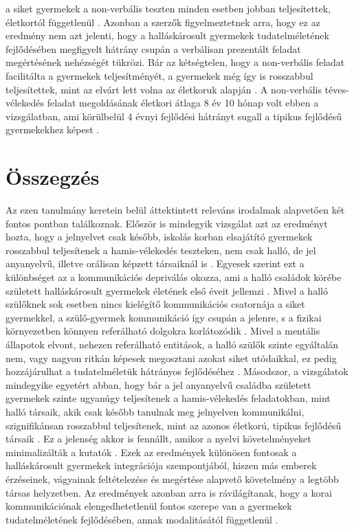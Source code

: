 a siket gyermekek a non-verbális teszten minden esetben jobban teljesítettek, életkortól
függetlenül \autocite{figueras-costa_harris_2001}. Azonban a szerzők figyelmeztetnek arra, hogy ez az eredmény nem azt
jelenti, hogy a halláskárosult gyermekek tudatelméletének fejlődésében megfigyelt hátrány
csupán a verbálisan prezentált feladat megértésének nehézségét tükrözi. Bár az kétségtelen,
hogy a non-verbális feladat facilitálta a gyermekek teljesítményét, a gyermekek még így is
rosszabbul teljesítettek, mint az elvárt lett volna az életkoruk alapján \autocite{figueras-costa_harris_2001}. A non-verbális
téves-vélekedés feladat megoldásának életkori átlaga 8 év 10 hónap volt ebben a vizsgálatban,
ami körülbelül 4 évnyi fejlődési hátrányt sugall a tipikus fejlődésű gyermekekhez képest
\autocite{figueras-costa_harris_2001}.

\pagebreak

\section{Összegzés}

Az ezen tanulmány keretein belül áttektintett releváns irodalmak alapvetően két fontos
pontban találkoznak. Először is mindegyik vizsgálat azt az eredményt hozta, hogy a jelnyelvet
csak később, iskolás korban elsajátító gyermekek rosszabbul teljesítenek a hamis-vélekedés
teszteken, nem csak halló, de jel anyanyelvű, illetve orálisan képzett társaiknál is \autocite{peterson_slaughter_2006,woolfe_want_siegal_2002,peterson_siegal_1999}.
Egyesek szerint ezt a különbséget az a kommunikációs depriválás okozza, ami a halló
családok körébe született halláskárosult gyermekek életének első éveit jellemzi \autocite{perner_leekam_wimmer_1987}. Mivel a
halló szülőknek sok esetben nincs kielégítő kommunikációs csatornája a siket gyermekkel, a
szülő-gyermek kommunikáció így csupán a jelenre, s a fizikai környezetben könnyen
referálható dolgokra korlátozódik \autocite{peterson_siegal_2000}. Mivel a mentális állapotok elvont, nehezen
referálható entitások, a halló szülők szinte egyáltalán nem, vagy nagyon ritkán képesek
megosztani azokat siket utódaikkal, ez pedig hozzájárulhat a tudatelméletük hátrányos
fejlődéséhez \autocite{peterson_siegal_2000}. Másodszor, a vizsgálatok mindegyike egyetért abban, hogy bár a
jel anyanyelvű családba született gyermekek szinte ugyanúgy teljesítenek a hamis-vélekedés
feladatokban, mint halló társaik, akik csak később tanulnak meg jelnyelven kommunikálni,
szignifikánsan rosszabbul teljesítenek, mint az azonos életkorú, tipikus fejlődésű társaik \autocite{peterson_slaughter_2006,woolfe_want_siegal_2002,peterson_siegal_1999}.
Ez a jelenség akkor is fennállt, amikor a nyelvi követelményeket minimalizálták a kutatók
\autocite{figueras-costa_harris_2001}. Ezek az eredmények különösen fontosak a halláskárosult gyermekek integrációja
szempontjából, hiszen más emberek érzéseinek, vágyainak feltételezése és megértése alapvető
követelmény a legtöbb társas helyzetben. Az eredmények azonban arra is rávilágítanak, hogy
a korai kommunikációnak elengedhetetlenül fontos szerepe van a gyermekek
tudatelméletének fejlődésében, annak modalitásától függetlenül \autocite{peterson_2004}.